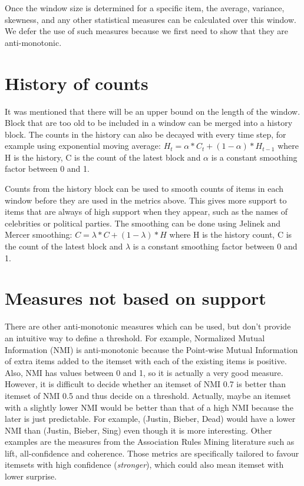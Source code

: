 \documentclass[11pt]{llncs} %
\begin{document}
Once the window size is determined for a specific item, the average, variance, skewness, and any other statistical measures can be calculated over this window. We defer the use of such measures because we first need to show that they are anti-monotonic.

\section{History of counts}
It was mentioned that there will be an upper bound on the length of the window. Block that are too old to be included in a window can be merged into a history block. The counts in the history can also be decayed with every time step, for example using exponential moving average: $H_t = \alpha * C_t + (1 - \alpha) * H_{t-1} $ where H is the history, C is the count of the latest block and $\alpha$ is a constant smoothing factor between 0 and 1. 

Counts from the history block can be used to smooth counts of items in each window before they are used in the metrics above. This gives more support to items that are always of high support when they appear, such as the names of celebrities or political parties. The smoothing can be done using Jelinek and Mercer smoothing: $C = \lambda * C + (1 - \lambda) * H $ where H is the history count, C is the count of the latest block and $\lambda$ is a constant smoothing factor between 0 and 1. 

\section{Measures not based on support}

There are other anti-monotonic measures which can be used, but don't provide an intuitive way to define a threshold. For example, Normalized Mutual Information (NMI) is anti-monotonic because the Point-wise Mutual Information of extra items added to the itemset with each of the existing items is positive. Also, NMI has values between 0 and 1, so it is actually a very good measure. However, it is difficult to decide whether an itemset of NMI 0.7 is better than itemset of NMI 0.5 and thus decide on a threshold. Actually, maybe an itemset with a slightly lower NMI would be better than that of a high NMI because the later is just predictable. For example, (Justin, Bieber, Dead) would have a lower NMI than (Justin, Bieber, Sing) even though it is more interesting. Other examples are the measures from the Association Rules Mining literature such as lift, all-confidence and coherence. Those metrics are specifically tailored to favour itemsets with high confidence (\emph{stronger}), which could also mean itemset with lower surprise.
\end{document}
